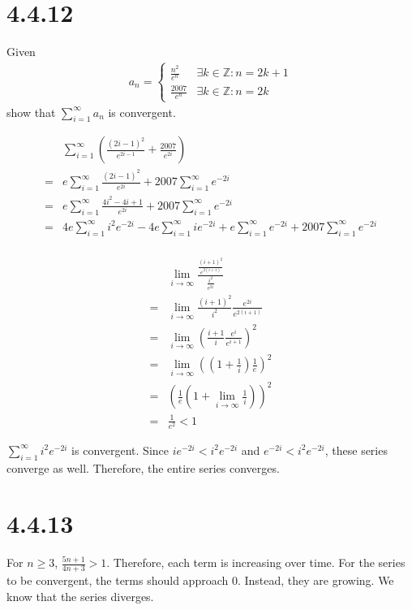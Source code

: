 \documentclass[12pt]{article}
\newcommand{\round}[1]{\left(       #1 \right)      }
\newcommand{\Z}    [0]{\mathbb{Z}                   }
\begin{document}
\section*{4.4.12}
Given
\begin{align*}
    a_n = \begin{cases}
        \frac{n^2}{e^n} & \exists k \in \Z : n = 2k+1 \\
        \frac{2007}{e^n} & \exists k \in \Z : n = 2k
    \end{cases}
\end{align*}
show that $\sum_{i=1}^\infty a_n$ is convergent.

\begin{align*}
     & \sum_{i=1}^\infty \round{\frac{(2i-1)^2}{e^{2i-1}} + \frac{2007}{e^{2i}}} \\
    =& e \sum_{i=1}^\infty \frac{(2i-1)^2}{e^{2i}} + 2007 \sum_{i=1}^\infty e^{-2i} \\
    =& e \sum_{i=1}^\infty \frac{4i^2 - 4i + 1}{e^{2i}} + 2007 \sum_{i=1}^\infty e^{-2i} \\
    =& 4e \sum_{i=1}^\infty i^2 e^{-2i} - 4e \sum_{i=1}^\infty ie^{-2i} + e \sum_{i=1}^\infty e^{-2i} + 2007 \sum_{i=1}^\infty e^{-2i} \\
\end{align*}

\begin{align*}
     & \lim_{i\to\infty} \frac{\frac{(i+1)^2}{e^{2(i+1)}}} {\frac{i^2}{e^{2i}}} \\
    =& \lim_{i\to\infty} \frac{(i+1)^2}{i^2} \frac{e^{2i}}{e^{2(i+1)}} \\
    =& \lim_{i\to\infty} \round{\frac{i+1}{i} \frac{e^{i}}{e^{i+1}}}^2 \\
    =& \lim_{i\to\infty} \round{\round{1+\frac{1}{i}} \frac{1}{e}}^2 \\
    =& \round{ \frac{1}{e} \round{1 + \lim_{i\to\infty} \frac{1}{i}} }^2 \\
    =& \frac{1}{e^2} < 1
\end{align*}

$\sum_{i=1}^\infty i^2 e^{-2i}$ is convergent. Since $i e^{-2i} < i^2 e^{-2i}$ and $e^{-2i} < i^2 e^{-2i}$, these series converge as well. Therefore, the entire series converges.



\section*{4.4.13}
For $n \geq 3$, $\frac{5n+1}{4n+3} > 1$. Therefore, each term is increasing over time. For the series to be convergent, the terms should approach 0. Instead, they are growing. We know that the series diverges.
\end{document}
